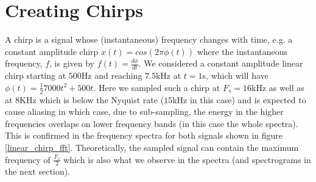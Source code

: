 \documentclass[10pt]{article}
\begin{document}
\section{Creating Chirps}
A chirp is a signal whose (instantaneous) frequency changes with time, e.g. a constant amplitude chirp $x(t) = cos(2\pi\phi(t))$ where the instantaneous frequency, $f$, is given by $f(t) = \frac{d\phi}{dt}$. We considered a constant amplitude linear chirp starting at $500$Hz and reaching $7.5$kHz at $t=1$s, which will have $\phi(t) = \frac{1}{2}7000t^2 + 500t$. Here we sampled such a chirp at $F_s = 16$kHz as well as at $8$KHz which is below the Nyquist rate ($15$kHz in this case) and is expected to cause aliasing in which case, due to sub-sampling, the energy in the higher frequencies overlaps on lower frequency bands (in this case the whole spectra). This is confirmed in the frequency spectra for both signals shown in figure \ref{linear_chirp_fft}. Theoretically, the sampled signal can contain the maximum frequency of $\frac{F_s}{2}$ which is also what we observe in the spectra (and spectrograms in the next section).
\end{document}
